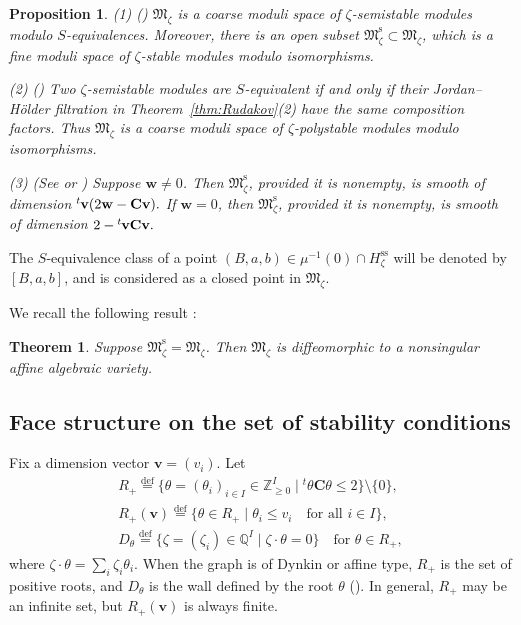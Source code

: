 \documentclass[pdftex]{sigma}
\newtheorem{Theorem}[equation]{Theorem}
\newtheorem{Proposition}[equation]{Proposition}
\theoremstyle{definition}
\numberwithin{equation}{section}
\newcommand{\lsp}[2]{{\mskip-.3mu}{}^{#1}\mskip-1mu{#2}}
\newcommand{\defeq}{\overset{\operatorname{\scriptstyle def}}{=}}
\newcommand{\Z}{{\mathbb Z}}
\newcommand{\Q}{{\mathbb Q}}
\newcommand{\M}{{\mathfrak M}} %
\newcommand{\Mreg}{\M^{\operatorname{s}}}
\newcommand{\bv}{{\mathbf v}} %
\newcommand{\bw}{{\mathbf w}} %
\newcommand{\bC}{{\mathbf C}} %
\begin{document}
\begin{Proposition}\label{prop:dim}
  \textup{(1) (\cite{King})} $\M_\zeta$ is a coarse moduli space of
  $\zeta$-semistable modules modulo $S$-equivalences.
%
  Moreover, there is an open subset $\Mreg_\zeta\subset\M_\zeta$,
  which is a fine moduli space of $\zeta$-stable modules modulo
  isomorphisms.

  \textup{(2) (\cite{King})} Two $\zeta$-semistable modules are
  $S$-equivalent if and only if their Jordan--H\"older filtration
  in Theorem~{\rm \ref{thm:Rudakov}(2)} have the same composition factors. Thus
  $\M_\zeta$ is a coarse moduli space of $\zeta$-polystable modules
  modulo isomorphisms.

  \textup{(3) (See \cite[2.6]{Na-quiver} or \cite[{3.12}]{Na-alg})}
  Suppose $\bw \neq 0$. Then
  $\Mreg_\zeta$, provided it is nonempty, is smooth of dimension
\(
   \lsp{t}{\bv}(2\bw - \bC \bv).
\)
If $\bw = 0$, then $\Mreg_\zeta$, provided it is nonempty, is smooth
of dimension
\(
   2 - \lsp{t}{\bv}\bC \bv.
\)
\end{Proposition}

The $S$-equivalence class of a point $(B,a,b)\in\mu^{-1}(0)\cap
H_{\zeta}^{\operatorname{ss}}$ will be denoted by $[B,a,b]$, and is
considered as a closed point in $\M_\zeta$.



We recall the following result \cite[3.1, 4.2]{Na-quiver}:

\begin{Theorem}\label{thm:affine}
  Suppose $\Mreg_\zeta = \M_\zeta$. Then $\M_\zeta$ is diffeomorphic
  to a nonsingular affine algebraic variety.
\end{Theorem}

\subsection{Face structure on the set of stability conditions}

Fix a dimension vector $\bv = (v_i)$. Let
\begin{gather*}
   R_+  \defeq \{ \theta = (\theta_i)_{i\in I} \in \Z_{\ge 0}^I \mid
     {}^t\theta \bC \theta \le 2\} \setminus \{0\}, \\
   R_+(\bv) \defeq \{ \theta\in R_+ \mid \theta_i \le v_i
       \quad\text{for all $i\in I$}\}, \\
   D_\theta \defeq \{ \zeta = (\zeta_i)\in \Q^I \mid
   \zeta\cdot \theta = 0 \} \quad\text{for $\theta\in R_+$},
\end{gather*}
where $\zeta\cdot \theta = \sum_i \zeta_i\theta_i$. When the graph is
of Dynkin or af\/f\/ine type, $R_+$ is the set of positive roots, and
$D_\theta$ is the wall def\/ined by the root $\theta$
(\cite[Proposition~5.10]{Kac}).
%
In general, $R_+$ may be an inf\/inite set, but $R_+(\bv)$ is always
f\/inite.
\end{document}
